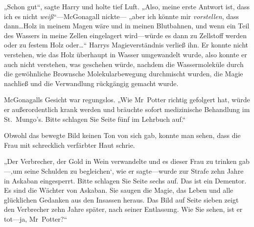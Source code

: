 „Schon gut“, sagte Harry und holte tief Luft. „Also, meine erste Antwort ist, dass ich es nicht \emph{weiß}“—McGonagall nickte— „aber ich könnte mir \emph{vorstellen}, dass dann…Holz in meinem Magen wäre und in meinen Blutbahnen, und wenn ein Teil des Wassers in meine Zellen eingelagert wird—würde es dann zu Zellstoff werden oder zu festem Holz oder…“ Harrys Magieverständnis verließ ihn. Er konnte nicht verstehen, wie das Holz überhaupt in Wasser umgewandelt wurde, also konnte er auch nicht verstehen, was geschehen würde, nachdem die Wassermoleküle durch die gewöhnliche Brownsche Molekularbewegung durchmischt wurden, die Magie nachließ und die Verwandlung rückgängig gemacht wurde.

McGonagalls Gesicht war regungslos. „Wie Mr~Potter richtig gefolgert hat, würde er außerordentlich krank werden und bräuchte sofort medizinische Behandlung im St.~Mungo’s. Bitte schlagen Sie Seite fünf im Lehrbuch auf.“

Obwohl das bewegte Bild keinen Ton von sich gab, konnte man sehen, dass die Frau mit schrecklich verfärbter Haut schrie.

„Der Verbrecher, der Gold in Wein verwandelte und es dieser Frau zu trinken gab—‚um seine Schulden zu begleichen‘, wie er sagte—wurde zur Strafe zehn Jahre in Askaban eingesperrt. Bitte schlagen Sie Seite sechs auf. Das ist ein Dementor. Es sind die Wächter von Askaban. Sie saugen die Magie, das Leben und alle glücklichen Gedanken aus den Insassen heraus. Das Bild auf Seite sieben zeigt den Verbrecher zehn Jahre später, nach seiner Entlassung. Wie Sie sehen, ist er tot—ja, Mr~Potter?“

